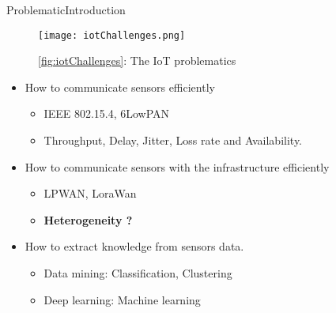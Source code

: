 		\begin{frame}[noframenumbering]{Problematic}{Introduction}
		\begin{figure}
		\texttt{[image: iotChallenges.png]}
		\caption*{ \ref{fig:iotChallenges}: The IoT problematics}
	\end{figure}
		\begin{itemize}
		\item How to communicate sensors efficiently
			\begin{itemize}
				\item IEEE 802.15.4, 6LowPAN
				\item Throughput, Delay, Jitter, Loss rate and Availability.
			\end{itemize}
		\item How to communicate sensors with the infrastructure efficiently
			\begin{itemize}
				\item LPWAN, LoraWan
				\item \textbf{Heterogeneity ?}
			\end{itemize}
		\item How to extract knowledge from sensors data.
			\begin{itemize}
				\item Data mining: Classification, Clustering
				\item Deep learning: Machine learning
			\end{itemize}
		\end{itemize}
		\end{frame}


